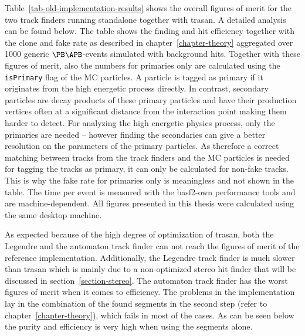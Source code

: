 Table~\ref{tab-old-implementation-results} shows the overall figures of merit for the two track finders running standalone together with trasan. A detailed analysis can be found below. The table shows the finding and hit efficiency together with the clone and fake rate as described in chapter~\ref{chapter-theory} aggregated over 1000 generic $\PB \APB$-events simulated with background hits. Together with these figures of merit, also the numbers for primaries only are calculated using the \verb+isPrimary+ flag of the MC particles. A particle is tagged as primary if it originates from the high energetic process directly. In contrast, secondary particles are decay products of these primary particles and have their production vertices often at a significant distance from the interaction point making them harder to detect. For analyzing the high energetic physics process, only the primaries are needed -- however finding the secondaries can give a better resolution on the parameters of the primary particles. As therefore a correct matching between tracks from the track finders and the MC particles is needed for tagging the tracks as primary, it can only be calculated for non-fake tracks. This is why the fake rate for primaries only is meaningless and not shown in the table. The time per event is measured with the basf2-own performance tools and are machine-dependent. All figures presented in this thesis were calculated using the same desktop machine.

As expected because of the high degree of optimization of trasan, both the Legendre and the automaton track finder can not reach the figures of merit of the reference implementation. Additionally, the Legendre track finder is much slower than trasan which is mainly due to a non-optimized stereo hit finder that will be discussed in section~\ref{section-stereo}. The automaton track finder has the worst figures of merit when it comes to efficiency. The problems in the implementation lay in the combination of the found segments in the second step (refer to chapter~\ref{chapter-theory}), which fails in most of the cases. As can be seen below the purity and efficiency is very high when using the segments alone.

